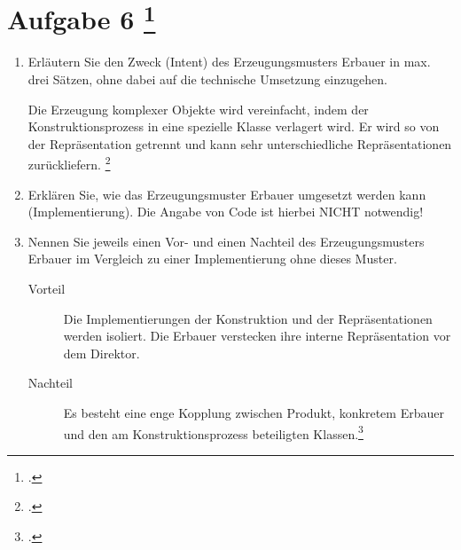 \documentclass{lehramt-informatik-aufgabe}
\begin{document}
\section{Aufgabe 6
\footcite{66116:2021:03}}
\begin{enumerate}


\item Erläutern Sie den Zweck (Intent) des Erzeugungsmusters Erbauer in
max. drei Sätzen, ohne dabei auf die technische Umsetzung einzugehen.

\begin{liAntwort}
Die Erzeugung komplexer Objekte wird vereinfacht, indem der
Konstruktionsprozess in eine spezielle Klasse verlagert wird. Er wird so
von der Repräsentation getrennt und kann sehr unterschiedliche
Repräsentationen zurückliefern.
\footcite[Seite 29]{eilebrecht}
\end{liAntwort}


\item Erklären Sie, wie das Erzeugungsmuster Erbauer umgesetzt werden
kann (Implementierung). Die Angabe von Code ist hierbei NICHT notwendig!


\item Nennen Sie jeweils einen Vor- und einen Nachteil des
Erzeugungsmusters Erbauer im Vergleich zu einer Implementierung ohne
dieses Muster.

\begin{liAntwort}
\begin{description}
\item[Vorteil]

Die Implementierungen der Konstruktion und der Repräsentationen werden
isoliert. Die Erbauer verstecken ihre interne Repräsentation vor dem
Direktor.

\item[Nachteil]

Es besteht eine enge Kopplung zwischen Produkt, konkretem Erbauer und
den am Konstruktionsprozess beteiligten Klassen.\footcite{wiki:erbauer}
\end{description}
\end{liAntwort}

\end{enumerate}

\begin{liExkurs}
\liEntwurfsErbauerUml

\liEntwurfsErbauerAkteure
\end{liExkurs}
\end{document}
